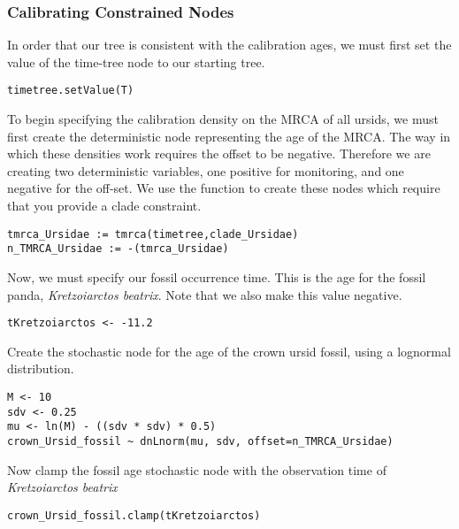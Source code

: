 \subsubsection{Calibrating Constrained Nodes}

In order that our tree is consistent with the calibration ages, we must first set the value of the time-tree node to our starting tree.
{\tt \begin{snugshade*}
\begin{lstlisting}
timetree.setValue(T)
\end{lstlisting}
\end{snugshade*}}

To begin specifying the calibration density on the MRCA of all ursids, we must first create the deterministic node representing the age of the MRCA.
The way in which these densities work requires the offset to be negative. 
Therefore we are creating two deterministic variables, one positive for monitoring, and one negative for the off-set.
We use the  function to create these nodes which require that you provide a clade constraint.
{\tt \begin{snugshade*}
\begin{lstlisting}
tmrca_Ursidae := tmrca(timetree,clade_Ursidae)
n_TMRCA_Ursidae := -(tmrca_Ursidae)
\end{lstlisting}
\end{snugshade*}}

Now, we must specify our fossil occurrence time.
This is the age for the fossil panda, \textit{Kretzoiarctos beatrix}.
Note that we also make this value negative.
{\tt \begin{snugshade*}
\begin{lstlisting}
tKretzoiarctos <- -11.2
\end{lstlisting}
\end{snugshade*}}

Create the stochastic node for the age of the crown ursid fossil, using a lognormal distribution.
{\tt \begin{snugshade*}
\begin{lstlisting}
M <- 10
sdv <- 0.25
mu <- ln(M) - ((sdv * sdv) * 0.5)
crown_Ursid_fossil ~ dnLnorm(mu, sdv, offset=n_TMRCA_Ursidae)
\end{lstlisting}
\end{snugshade*}}

Now clamp the fossil age stochastic node with the observation time of \textit{Kretzoiarctos beatrix}
{\tt \begin{snugshade*}
\begin{lstlisting}
crown_Ursid_fossil.clamp(tKretzoiarctos)
\end{lstlisting}
\end{snugshade*}}

